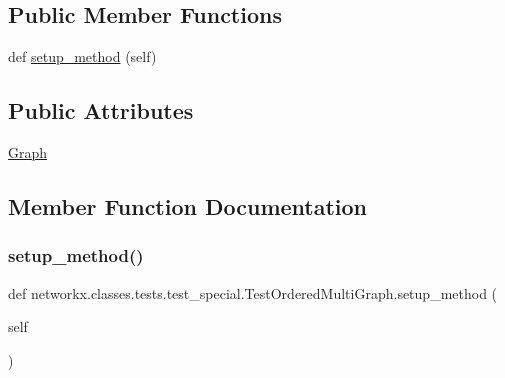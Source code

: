 \subsection*{Public Member Functions}
\begin{DoxyCompactItemize}
\item 
def \hyperlink{classnetworkx_1_1classes_1_1tests_1_1test__special_1_1TestOrderedMultiGraph_a00d22524bcf8f4eb4ec349e570d8813c}{setup\+\_\+method} (self)
\end{DoxyCompactItemize}
\subsection*{Public Attributes}
\begin{DoxyCompactItemize}
\item 
\hyperlink{classnetworkx_1_1classes_1_1tests_1_1test__special_1_1TestOrderedMultiGraph_a83a6135c668ecedf9b5a70558db0065b}{Graph}
\end{DoxyCompactItemize}


\subsection{Member Function Documentation}
\mbox{\label{classnetworkx_1_1classes_1_1tests_1_1test__special_1_1TestOrderedMultiGraph_a00d22524bcf8f4eb4ec349e570d8813c}} 
\subsubsection{\texorpdfstring{setup\+\_\+method()}{setup\_method()}}
{\footnotesize\ttfamily def networkx.\+classes.\+tests.\+test\+\_\+special.\+Test\+Ordered\+Multi\+Graph.\+setup\+\_\+method (\begin{DoxyParamCaption}\item[{}]{self }\end{DoxyParamCaption})}



